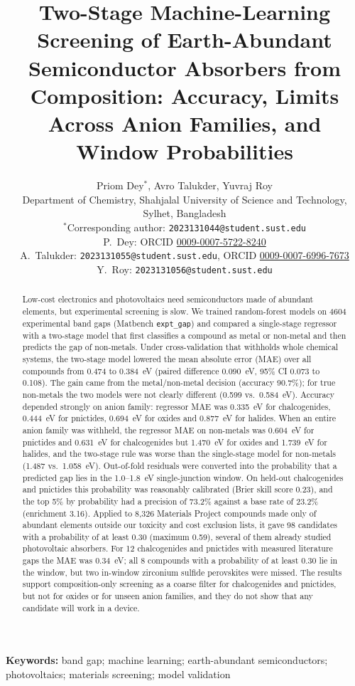 \documentclass[11pt,a4paper]{article}
\title{Two-Stage Machine-Learning Screening of Earth-Abundant Semiconductor Absorbers from Composition: Accuracy, Limits Across Anion Families, and Window Probabilities}
\author{%
Priom Dey$^{*}$, Avro Talukder, Yuvraj Roy\\[4pt]
\small Department of Chemistry, Shahjalal University of Science and Technology, Sylhet, Bangladesh\\[4pt]
\small $^{*}$Corresponding author: \texttt{2023131044@student.sust.edu}\\[2pt]
\small P.~Dey: ORCID \href{https://orcid.org/0009-0007-5722-8240}{0009-0007-5722-8240}\\
\small A.~Talukder: \texttt{2023131055@student.sust.edu}, ORCID \href{https://orcid.org/0009-0007-6996-7673}{0009-0007-6996-7673}\\
\small Y.~Roy: \texttt{2023131056@student.sust.edu}}
\date{}
\begin{document}
\sloppy\maketitle

\begin{abstract}
Low-cost electronics and photovoltaics need semiconductors made of abundant elements, but experimental screening is slow.
We trained random-forest models on 4604 experimental band gaps (Matbench \texttt{expt\_gap}) and compared a single-stage regressor with a two-stage model that first classifies a compound as metal or non-metal and then predicts the gap of non-metals. Under cross-validation that withholds whole chemical systems, the two-stage model lowered the mean absolute error (MAE) over all compounds from 0.474 to 0.384~eV (paired difference 0.090~eV, 95\% CI 0.073 to 0.108). The gain came from the metal/non-metal decision (accuracy 90.7\%); for true non-metals the two models were not clearly different (0.599 vs.\ 0.584~eV).
Accuracy depended strongly on anion family: regressor MAE was 0.335~eV for chalcogenides, 0.444~eV for pnictides, 0.694~eV for oxides and 0.877~eV for halides. When an entire anion family was withheld, the regressor MAE on non-metals was 0.604~eV for pnictides and 0.631~eV for chalcogenides but 1.470~eV for oxides and 1.739~eV for halides, and the two-stage rule was worse than the single-stage model for non-metals (1.487 vs.\ 1.058~eV).
Out-of-fold residuals were converted into the probability that a predicted gap lies in the 1.0--1.8~eV single-junction window. On held-out chalcogenides and pnictides this probability was reasonably calibrated (Brier skill score 0.23), and the top 5\% by probability had a precision of 73.2\% against a base rate of 23.2\% (enrichment 3.16). Applied to 8,326 Materials Project compounds made only of abundant elements outside our toxicity and cost exclusion lists, it gave 98 candidates with a probability of at least 0.30 (maximum 0.59), several of them already studied photovoltaic absorbers.
For 12 chalcogenides and pnictides with measured literature gaps the MAE was 0.34~eV; all 8 compounds with a probability of at least 0.30 lie in the window, but two in-window zirconium sulfide perovskites were missed.
The results support composition-only screening as a coarse filter for chalcogenides and pnictides, but not for oxides or for unseen anion families, and they do not show that any candidate will work in a device.
\end{abstract}
\noindent\textbf{Keywords:} band gap; machine learning; earth-abundant semiconductors; photovoltaics; materials screening; model validation
\end{document}
